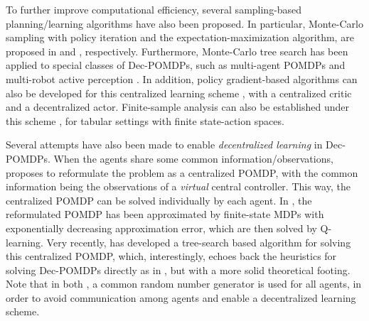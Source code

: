 To further improve  computational  efficiency, 
several sampling-based planning/learning algorithms have also been proposed.  {In particular, } Monte-Carlo sampling {with} policy iteration and {the expectation-maximization} algorithm, are proposed in \cite{wu2010rollout} and \cite{wu2013monte},  respectively. 
Furthermore, Monte-Carlo tree search   has been applied {to} special classes of Dec-POMDPs, such as  multi-agent POMDPs \cite{amato2015scalable} and multi-robot active perception \cite{best2018dec}.  
In addition, policy gradient-based algorithms can also be developed for this centralized learning scheme \cite{dibangoye2018learning}, with a centralized critic and a decentralized actor.  
Finite-sample analysis can also be   established under this scheme \cite{amato2009achieving,banerjee2012sample}, for tabular settings with finite state-action spaces. 

Several attempts have also been  made to  enable \emph{decentralized learning} in Dec-POMDPs. When the agents share some common information/observations, \cite{nayyar2013decentralized} proposes to reformulate the problem as a centralized POMDP, with the common information being the observations of a \emph{virtual} central controller. This way, the centralized POMDP can be solved individually by each agent. In \cite{arabneydi2015reinforcement}, the reformulated POMDP has been  approximated by finite-state MDPs with exponentially decreasing approximation error, which are then solved by  Q-learning. Very  recently, \cite{zhang2019online} has developed a tree-search based algorithm for solving this centralized POMDP, which, interestingly, echoes back the heuristics for solving Dec-POMDPs directly as in \cite{amato2015scalable,best2018dec}, but with a more solid theoretical footing. Note that in both \cite{arabneydi2015reinforcement,zhang2019online}, a common random number generator  is used for all agents, in order to avoid communication among agents and enable a decentralized learning scheme.   
 
 


 
